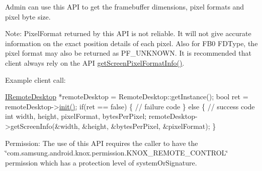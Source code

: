 \-Admin can use this \-A\-P\-I to get the framebuffer dimensions, pixel formats and pixel byte size.

\-Note\-: \-Pixel\-Format returned by this \-A\-P\-I is not reliable. \-It will not give accurate information on the exact position details of each pixel. \-Also for \-F\-B0 \-F\-D\-Type, the pixel format may also be returned as \-P\-F\-\_\-\-U\-N\-K\-N\-O\-W\-N. \-It is recommended that client always rely on the \-A\-P\-I \hyperlink{classknoxremotedesktop_1_1IRemoteDesktop_a700dee2f575609a933a53d7ab10480e4}{get\-Screen\-Pixel\-Format\-Info()}.

\-Example client call\-:


\begin{DoxyPre}
  \hyperlink{classknoxremotedesktop_1_1IRemoteDesktop}{IRemoteDesktop} *remoteDesktop = RemoteDesktop::getInstance();
  bool ret = remoteDesktop->\hyperlink{classknoxremotedesktop_1_1IRemoteDesktop_a7bed40d98c61713a69cf1dad8b37beae}{init()};
  if(ret == false)  \{
     // failure code
  \} else \{
     // success code	 
     int	width, height, pixelFormat, bytesPerPixel;	 
     remoteDesktop->getScreenInfo(&width, &height, &bytesPerPixel, &pixelFormat);
  \}
 \end{DoxyPre}


\begin{DoxyParagraph}{\-Permission\-: }
\-The use of this \-A\-P\-I requires the caller to have the \char`\"{}com.\-samsung.\-android.\-knox.\-permission.\-K\-N\-O\-X\-\_\-\-R\-E\-M\-O\-T\-E\-\_\-\-C\-O\-N\-T\-R\-O\-L\char`\"{} permission which has a protection level of system\-Or\-Signature.
\end{DoxyParagraph}

